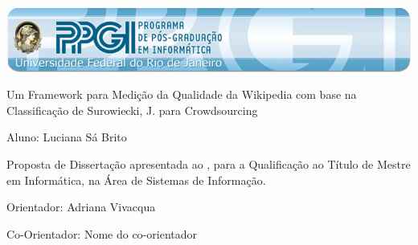 


\begin{titlepage}

\begin{center}
\includegraphics[width=\textwidth]{ppgi.jpg}

\par
\vspace{80pt}
{\Huge Um Framework para Medição da Qualidade da Wikipedia com base na Classificação de Surowiecki, J. para Crowdsourcing
}
\par
\vspace{30pt}
{\LARGE Aluno: \Luciana Luciana Sá Brito}
\end{center}
\par
\vspace{90pt}
\hspace*{175pt}\parbox{7.6cm}{{\large Proposta de Dissertação apresentada ao \programa, para a Qualificação ao Título de Mestre em Informática, na Área de Sistemas de Informação.}}

\par
\vspace{1em}
\hspace*{175pt}\parbox{7.6cm}{{\large Orientador: Adriana Vivacqua}}
\par
\vspace{1em}
\hspace*{175pt}\parbox{7.6cm}{\large Co-Orientador: Nome do co-orientador}
\par
\vfill
\begin{center}
\textbf{{\large \localidade}\\
{\large \the\year}}
\end{center}
\end{titlepage}

